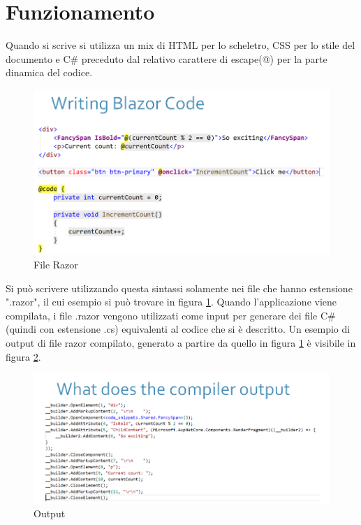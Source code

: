 \section{Funzionamento}\label{sez:funzionamento}
Quando si scrive si utilizza un mix di HTML per lo scheletro, CSS per lo stile del documento e C\# preceduto dal relativo carattere di escape(@) per la parte dinamica del codice.
\begin{figure}[H]
	\centerline{\includegraphics[scale=0.55]{figure/RazorFile.png}}
	\caption{File Razor\cite{ryanNowakNDCSydney}}
	\label{fig:razorFile}
\end{figure}
Si pu\`o scrivere utilizzando questa sintassi solamente nei file che hanno estensione ".razor", il cui esempio si pu\`o trovare in figura \ref{fig:razorFile}.
Quando l'applicazione viene compilata, i file .razor vengono utilizzati come input per generare dei file C\#(quindi con estensione .cs) equivalenti al codice che si \`e descritto.\cite{ryanNowakNDCSydney}
Un esempio di output di file razor compilato, generato a partire da quello in figura \ref{fig:razorFile} \`e visibile in figura \ref{fig:compiledRazorFile}.
\begin{figure}[H]
	\centerline{\includegraphics[scale=0.55]{figure/RazorFileCompiled.PNG}}
	\caption{Output\cite{ryanNowakNDCSydney}}
	\label{fig:compiledRazorFile}
\end{figure}

